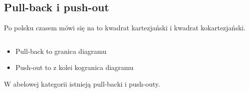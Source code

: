 \subsection{Pull-back i push-out}

Po polsku czasem mówi się na to kwadrat kartezjański i kwadrat kokartezjański.

\begin{definition}$ $\newline
  \begin{itemize}
    \item Pull-back to granica diagramu
      \begin{center}\end{center}
    \item Push-out to z kolei kogranica diagramu
      \begin{center}\end{center}
  \end{itemize}
\end{definition}

\begin{fact}
  W abelowej kategorii istnieją pull-backi i push-outy.
\end{fact}

